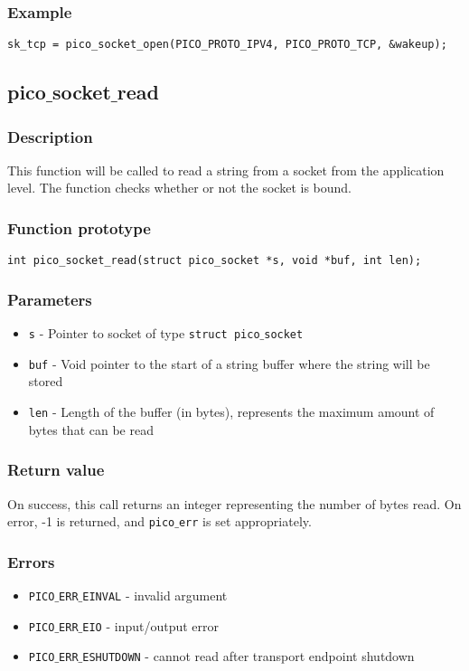 \subsubsection*{Example}
\begin{verbatim}
sk_tcp = pico_socket_open(PICO_PROTO_IPV4, PICO_PROTO_TCP, &wakeup);
\end{verbatim}


\subsection{pico$\_$socket$\_$read}

\subsubsection*{Description}
This function will be called to read a string from a socket from the application level. The function checks whether or not the socket is bound.

\subsubsection*{Function prototype}
\begin{verbatim}
int pico_socket_read(struct pico_socket *s, void *buf, int len);
\end{verbatim}

\subsubsection*{Parameters}
\begin{itemize}[noitemsep]
\item \texttt{s} - Pointer to socket of type \texttt{struct pico$\_$socket}
\item \texttt{buf} - Void pointer to the start of a string buffer where the string will be stored
\item \texttt{len} - Length of the buffer (in bytes), represents the maximum amount of bytes that can be read
\end{itemize}

\subsubsection*{Return value}
On success, this call returns an integer representing the number of bytes read.
On error, -1 is returned, and \texttt{pico$\_$err} is set appropriately.

\subsubsection*{Errors}
\begin{itemize}[noitemsep]
\item \texttt{PICO$\_$ERR$\_$EINVAL} - invalid argument
\item \texttt{PICO$\_$ERR$\_$EIO} - input/output error
\item \texttt{PICO$\_$ERR$\_$ESHUTDOWN} - cannot read after transport endpoint shutdown
\end{itemize}

